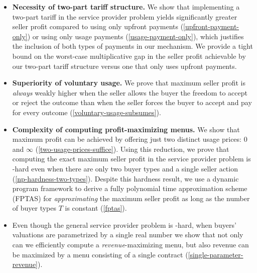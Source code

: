 \begin{itemize}
    
    \item \textbf{Necessity of two-part tariff structure.} 
    We show that implementing a two-part tariff in the service provider problem yields significantly greater seller profit compared to using only upfront payments (\cref{upfront-payment-only}) or using only usage payments (\cref{usage-payment-only}), which justifies the inclusion of both types of payments in our mechanism. We provide a tight bound on the worst-case multiplicative gap in the seller profit achievable by our two-part tariff structure versus one that only uses upfront payments.
    
    \item \textbf{Superiority of voluntary usage.} We prove that maximum seller profit is \emph{always} weakly higher when the seller allows the buyer the freedom to accept or reject the outcome than when the seller forces the buyer to accept and pay for every outcome (\cref{voluntary-usage-subsumes}).
    
    \item \textbf{Complexity of computing profit-maximizing menus.}  We show that maximum profit can be achieved by offering just two distinct usage prices: 0 and $\infty$ (\cref{two-usage-prices-suffice}). Using this reduction, we prove that computing the exact maximum seller profit in the service provider problem is -hard even when there are only two buyer types and a single seller action (\cref{np-hardness-two-types}). Despite this hardness result, we use a dynamic program framework to derive a fully polynomial time approximation scheme (FPTAS) for \emph{approximating} the maximum seller profit as long as the number of buyer types $T$ is constant (\cref{fptas}). 
    
    \item {} Even though the general service provider problem is -hard, when buyers' valuations are parametrized by a single real number we show that not only can we efficiently compute a \emph{revenue}-maximizing menu, but also revenue can be maximized by a menu consisting of a single contract (\cref{single-parameter-revenue}).
\end{itemize}

